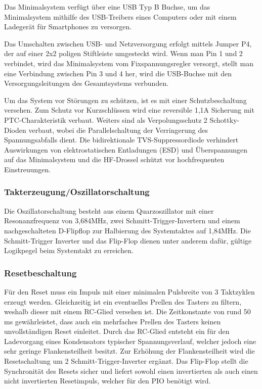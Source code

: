Das Minimalsystem verfügt über eine USB Typ B Buchse, um das Minimalsystem mithilfe des USB-Treibers eines Computers oder mit einem Ladegerät für Smartphones zu versorgen.

Das Umschalten zwischen USB- und Netzversorgung erfolgt mittels Jumper P4, der auf einer 2x2 poligen Stiftleiste umgesteckt wird. Wenn man Pin 1 und 2 verbindet, wird das Minimalsystem vom Fixspannungsregler versorgt, stellt man eine Verbindung zwischen Pin 3 und 4 her, wird die USB-Buchse mit den Versorgungsleitungen des Gesamtsystems verbunden.

Um das System vor Störungen zu schützen, ist es mit einer Schutzbeschaltung versehen. Zum Schutz vor Kurzschlüssen wird eine reversible 1,1A Sicherung mit PTC-Charakteristik verbaut. Weiters sind als Verpolungsschutz 2 Schottky-Dioden verbaut, wobei die Parallelschaltung der Verringerung des Spannungsabfalls dient. Die bidirektionale TVS-Suppressordiode verhindert Auswirkungen von elektrostatischen Entladungen (ESD) und Überspannungen auf das Minimalsystem und die HF-Drossel schützt vor hochfrequenten Einstreuungen.

\subsubsection{Takterzeugung/Oszillatorschaltung}
Die Oszillatorschaltung besteht aus einem Quarzoszillator mit einer Resonanzfrequenz von 3,684MHz, zwei Schmitt-Trigger-Invertern und einem nachgeschalteten D-Flipflop zur Halbierung des Systemtaktes auf 1,84MHz. Die Schmitt-Trigger Inverter und das Flip-Flop dienen unter anderem dafür, gültige Logikpegel beim Systemtakt zu erreichen.

\subsubsection{Resetbeschaltung}
Für den Reset muss ein Impuls mit einer minimalen Pulsbreite von 3 Taktzyklen erzeugt werden. Gleichzeitig ist ein eventuelles Prellen des Tasters zu filtern, weshalb dieser mit einem RC-Glied versehen ist. Die Zeitkonstante von rund 50 ms gewährleistet, dass auch ein mehrfaches Prellen des Tasters keinen unvollständigen Reset einleitet. Durch das RC-Glied entsteht ein für den Ladevorgang eines Kondensators typischer Spannungsverlauf, welcher jedoch eine sehr geringe Flankensteilheit besitzt. Zur Erhöhung der Flankensteilheit wird die Resetschaltung um 2 Schmitt-Trigger-Inverter ergänzt. Das Flip-Flop stellt die Synchronität des Resets sicher und liefert sowohl einen invertierten als auch einen nicht invertierten Resetimpuls, welcher für den PIO benötigt wird.

